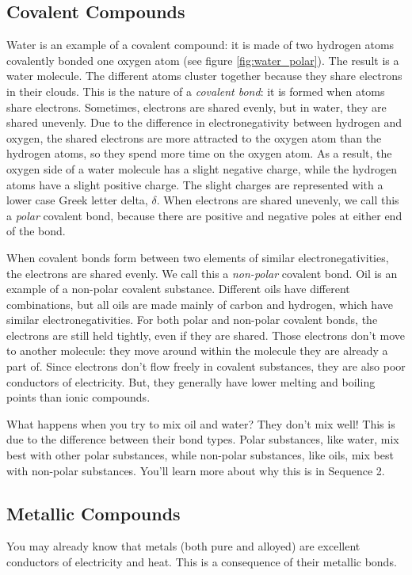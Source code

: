 \subsection{Covalent Compounds}
Water is an example of a covalent compound: it is made of two hydrogen atoms 
covalently bonded one oxygen atom (see figure \ref{fig:water_polar}). The result 
is a water molecule. The different atoms cluster together 
because they share electrons in their clouds. This is the nature of a 
\textit{covalent bond}: it is formed when atoms share electrons.
Sometimes, electrons are shared evenly, but in water, they are shared unevenly. 
Due to the difference in electronegativity between hydrogen and oxygen, the 
shared electrons are more attracted to the oxygen atom than the hydrogen atoms, 
so they spend more time on the oxygen atom. As a result, the oxygen side of a 
water molecule has a slight negative charge, while the hydrogen atoms have a 
slight positive charge. The slight charges are represented with a lower case 
Greek letter delta, $\delta$. When electrons are shared unevenly, we call this a
\textit{polar} covalent bond, because there are positive and negative poles at 
either end of the bond.  

When covalent bonds form between two elements of similar electronegativities, 
the electrons are shared evenly. We call this a \textit{non-polar} covalent bond. 
Oil is an example of a non-polar covalent substance. Different oils have different
combinations, but all oils are made mainly of carbon and hydrogen, which have similar
electronegativities. For both polar and non-polar covalent bonds, the electrons 
are still held tightly, even if they are shared. Those electrons don't move to 
another molecule: they move around within the molecule they are already a part 
of. Since electrons don't flow freely in covalent substances, they are also poor 
conductors of electricity. But, they generally have lower melting and boiling 
points than ionic compounds. 

What happens when you try to mix oil and water? They don't mix well! This is due 
to the difference between their bond types. Polar substances, like water, mix best
with other polar substances, while non-polar substances, like oils, mix best with 
non-polar substances. You'll learn more about why this is in Sequence 2.

\subsection{Metallic Compounds}
You may already know that metals (both pure and alloyed) are excellent conductors of electricity and heat. This is a consequence of their metallic bonds. 



